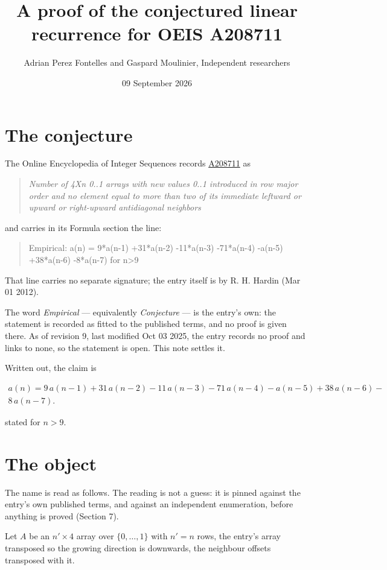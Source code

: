 \documentclass[11pt]{article}
\title{A proof of the conjectured linear recurrence for OEIS A208711}
\author{Adrian Perez Fontelles and Gaspard Moulinier, Independent researchers}
\date{09 September 2026}
\theoremstyle{definition}
\begin{document}
\maketitle
\section{The conjecture}

The Online Encyclopedia of Integer Sequences records \href{https://oeis.org/A208711}{A208711} as

\begin{quote}\itshape Number of 4Xn 0..1 arrays with new values 0..1 introduced in row major order and no element equal to more than two of its immediate leftward or upward or right-upward antidiagonal neighbors\end{quote}

and carries in its Formula section the line:

\begin{quote}\ttfamily Empirical: a(n) = 9*a(n-1) +31*a(n-2) -11*a(n-3) -71*a(n-4) -a(n-5) +38*a(n-6) -8*a(n-7) for n>9\end{quote}

That line carries no separate signature; the entry itself is by R. H. Hardin (Mar 01 2012).

The word {\itshape Empirical} --- equivalently {\itshape Conjecture} --- is the entry's own: the statement is recorded as fitted to the published terms, and no proof is given there. As of revision 9, last modified Oct 03 2025, the entry records no proof and links to none, so the statement is open. This note settles it.

Written out, the claim is

\begin{multline*} a(n) = 9\,a(n-1) + 31\,a(n-2) - 11\,a(n-3) - 71\,a(n-4) - a(n-5) + 38\,a(n-6) - \\ 8\,a(n-7). \end{multline*}

stated for $n > 9$.

\section{The object}

The name is read as follows. The reading is not a guess: it is pinned against the entry's own published terms, and against an independent enumeration, before anything is proved (Section 7).

Let $A$ be an $n' \times 4$ array over $\{0,\dots,1\}$ with $n' = n$ rows, the entry's array transposed so the growing direction is downwards, the neighbour offsets transposed with it.
\end{document}
